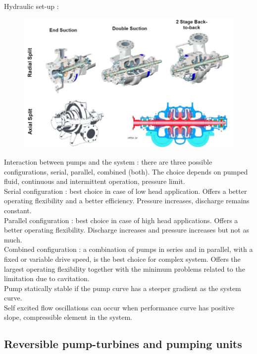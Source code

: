 \documentclass[../main.tex]{subfiles}
\begin{document}
Hydraulic set-up : \begin{figure}[hbt!]
    \centering
    \includegraphics[width=0.5\linewidth]{IMAGES/Hydraulic/Screenshot from 2024-11-28 11-22-17.png}
\end{figure}

Interaction between pumps and the system : there are three possible configurations, serial, parallel, combined (both). The choice depends on pumped fluid, continuous and intermittent operation, pressure limit.\\
Serial configuration : best choice in case of low head application. Offers a better operating flexibility and a better efficiency. Pressure increases, discharge remains constant. \\
Parallel configuration : best choice in case of high head applications. Offers a better operating flexibility. Discharge increases and pressure increases but not as much.\\
Combined configuration : a combination of pumps in series and in parallel, with a fixed or variable drive speed, is the best choice for complex system. Offers the largest operating flexibility together with the minimum problems related to the limitation due to cavitation.\\

Pump statically stable if the pump curve has a steeper gradient as the system curve. \\
Self excited flow oscillations can occur when performance curve has positive slope, compressible element in the system. \\

\subsection{Reversible pump-turbines and pumping units}
\end{document}
